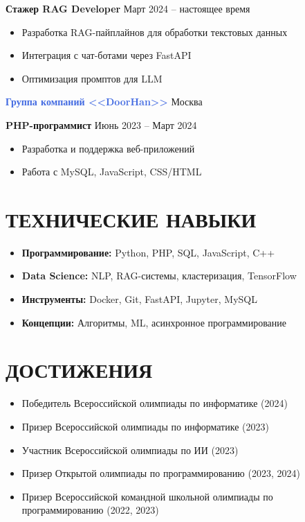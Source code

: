 \documentclass[margin]{res}
\begin{document}
\begin{resume}
\textbf{Стажер RAG Developer} \hfill Март 2024 -- настоящее время
\begin{itemize}[leftmargin=*,topsep=0pt,itemsep=0pt,parsep=0pt]
    \item Разработка RAG-пайплайнов для обработки текстовых данных
    \item Интеграция с чат-ботами через FastAPI
    \item Оптимизация промптов для LLM
\end{itemize}

\vspace{0.5em}
\textbf{\textcolor{royalblue}{Группа компаний <<DoorHan>>}} \hfill Москва

\textbf{PHP-программист} \hfill Июнь 2023 -- Март 2024
\begin{itemize}[leftmargin=*,topsep=0pt,itemsep=0pt,parsep=0pt]
    \item Разработка и поддержка веб-приложений
    \item Работа с MySQL, JavaScript, CSS/HTML
\end{itemize}

{\color{royalblue} \section{ТЕХНИЧЕСКИЕ НАВЫКИ}}
\begin{itemize}[leftmargin=*,topsep=0pt,itemsep=0pt,parsep=0pt]
    \item \textbf{Программирование:} Python, PHP, SQL, JavaScript, C++
    \item \textbf{Data Science:} NLP, RAG-системы, кластеризация, TensorFlow
    \item \textbf{Инструменты:} Docker, Git, FastAPI, Jupyter, MySQL
    \item \textbf{Концепции:} Алгоритмы, ML, асинхронное программирование
\end{itemize}

{\color{royalblue} \section{ДОСТИЖЕНИЯ}}
\begin{itemize}[leftmargin=*,topsep=0pt,itemsep=0pt,parsep=0pt]
    \item Победитель Всероссийской олимпиады по информатике (2024)
    \item Призер Всероссийской олимпиады по информатике (2023)
    \item Участник Всероссийской олимпиады по ИИ (2023)
    \item Призер Открытой олимпиады по программированию (2023, 2024)
    \item Призер Всероссийской командной школьной олимпиады по программированию (2022, 2023)
\end{itemize}


\end{resume}
\end{document}
